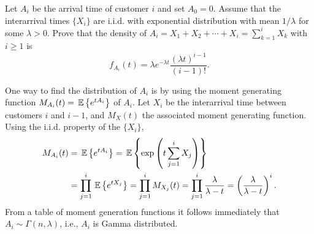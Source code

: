   \begin{question}
 Let $A_i$ be the arrival time of customer $i$ and set $A_0=0$.
    Assume that the interarrival times $\{X_i\}$ are i.i.d.  with
    exponential distribution with mean $1/\lambda$ for some
    $\lambda>0$.  Prove that the density of
    $A_i=X_1+X_2+\cdots+X_i=\sum_{k=1}^i X_k$ with $i\geq 1$ is
\begin{equation*}
f_{A_i}(t) = \lambda e^{-\lambda t} \frac{(\lambda t)^{i-1}}{(i-1)!}. 
\end{equation*}
\begin{solution}
 One way to find the distribution of $A_i$ is by using the
    moment generating function $M_{A_i}(t) = \,\mathbb{E}\left\{e^{t A_i}\right\}$ of
    $A_i$. Let $X_i$ be the interarrival time between customers $i$
    and $i-1$, and $M_X(t)$ the associated moment generating
    function. Using the i.i.d. property of the $\{X_i\}$,
\begin{equation*}
  \begin{split}
  M_{A_i}(t) &= \,\mathbb{E}\left\{e^{t A_i}\right\} = \,\mathbb{E}\left\{\exp\left(t\sum_{j=1}^{i} X_j\right)\right\} \\
& = \prod_{j=1}^{i} \,\mathbb{E}\left\{e^{tX_j}\right\} = 
\prod_{j=1}^{i} M_{X_j}(t) = 
\prod_{j=1}^{i} \frac{\lambda}{\lambda -t }
 = \left(\frac{\lambda}{\lambda -t }\right)^i.
  \end{split}
\end{equation*}
From a table of moment generation functions it follows immediately that
$A_i \sim \Gamma(n,\lambda)$, i.e., $A_i$ is Gamma distributed.
\end{solution}

\end{question}

